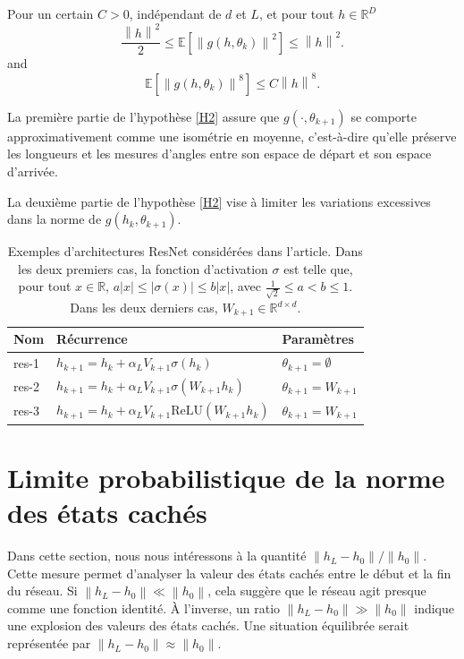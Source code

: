 \begin{assumption}\label{H2}
    Pour un certain $ C > 0 $, indépendant de $ d $ et $ L $, et pour tout $ h \in \mathbb{R}^D  $ 
    \[
        \frac{\left\| h \right\| ^2}{2 } \leq  \mathbb{E }[ \left\|  g(h, \theta _ k ) \right\| ^2 ] \leq \left\| h \right\| ^2
    .\]
    and
    \[
        \mathbb{E } [\left\| g(h, \theta _k)  \right\| ^8 ]\leq C \left\| h  \right\| ^8
    .\]
\end{assumption}
\begin{note}
    La première partie de l'hypothèse \ref{H2} assure que $g(\cdot, \theta_{k+1})$ se comporte approximativement comme une isométrie en moyenne, c'est-à-dire qu'elle préserve les longueurs et les mesures d'angles entre son espace de départ et son espace d'arrivée.

    La deuxième partie de l'hypothèse \ref{H2} vise à limiter les variations excessives dans la norme de $g(h_k, \theta_{k+1})$.
\end{note}


\begin{table}[h]
    \centering
    \begin{tabular}{lll}
        \hline
        \textbf{Nom} & \textbf{Récurrence} & \textbf{Paramètres} \\ \hline
        res-1 & \( h_{k+1} = h_k + \alpha_L V_{k+1}\sigma(h_k) \) & \( \theta_{k+1} = \emptyset \) \\
        res-2 & \( h_{k+1} = h_k + \alpha_L V_{k+1}\sigma(W_{k+1}h_k) \) & \( \theta_{k+1} = W_{k+1} \) \\
        res-3 & \( h_{k+1} = h_k + \alpha_L V_{k+1}\text{ReLU}(W_{k+1}h_k) \) & \( \theta_{k+1} = W_{k+1} \) \\ \hline
    \end{tabular}
    \caption{Exemples d'architectures ResNet considérées dans l'article. Dans les deux premiers cas, la fonction d'activation \( \sigma \) est telle que, pour tout \( x \in \mathbb{R} \), \( a|x| \leq |\sigma(x)| \leq b|x| \), avec \( \frac{1}{\sqrt{2}} \leq a < b \leq 1 \). Dans les deux derniers cas, \( W_{k+1} \in \mathbb{R}^{d \times d} \).}
    \label{tab:resnet_architectures}
\end{table}

\section{Limite probabilistique de la norme des états cachés}

Dans cette section, nous nous intéressons à la quantité $ {\left\| h_L - h_0 \right\|} / {\left\| h_0 \right\|}$. Cette mesure permet d'analyser la valeur des états cachés entre le début et la fin du réseau. Si $\left\| h_L - h_0 \right\| \ll \left\| h_0 \right\|$, cela suggère que le réseau agit presque comme une fonction identité. À l'inverse, un ratio $\left\| h_L - h_0 \right\| \gg \left\| h_0 \right\|$ indique une explosion des valeurs des états cachés. Une situation équilibrée serait représentée par $\left\| h_L - h_0 \right\| \approx \left\| h_0 \right\|$.

